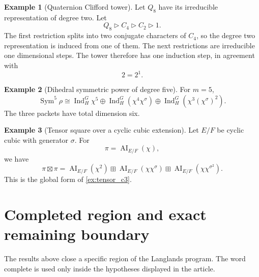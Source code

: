 \documentclass{aomart}
\theoremstyle{definition}
\newtheorem{example}[example]{Example}
\theoremstyle{remark}
\newcommand{\Ind}{\operatorname{Ind}}
\newcommand{\AI}{\operatorname{AI}}
\newcommand{\Sym}{\operatorname{Sym}}
\newcommand{\boxplusop}{\mathbin{\boxplus}}
\begin{document}
\begin{example}[Quaternion Clifford tower]\label{ex:quaternion_tower}
Let \(Q_8\) have its irreducible representation of degree two. Let
\[
Q_8\triangleright C_4\triangleright C_2\triangleright1.
\]
The first restriction splits into two conjugate characters of \(C_4\), so the degree two representation is induced from one of them. The next restrictions are irreducible one dimensional steps. The tower therefore has one induction step, in agreement with
\[
2=2^1.
\]
\end{example}

\begin{example}[Dihedral symmetric power of degree five]\label{ex:dihedral_five}
For \(m=5\),
\[
\Sym^5\rho
\cong
\Ind_H^G\chi^5
\oplus
\Ind_H^G(\chi^4\chi^\sigma)
\oplus
\Ind_H^G(\chi^3(\chi^\sigma)^2).
\]
The three packets have total dimension six.
\end{example}

\begin{example}[Tensor square over a cyclic cubic extension]\label{ex:cubic_tensor_square}
Let \(E/F\) be cyclic cubic with generator \(\sigma\). For
\[
\pi=\AI_{E/F}(\chi),
\]
we have
\[
\pi\boxtimes\pi
=
\AI_{E/F}(\chi^2)
\boxplusop
\AI_{E/F}(\chi\chi^\sigma)
\boxplusop
\AI_{E/F}(\chi\chi^{\sigma^2}).
\]
This is the global form of \cref{ex:tensor_c3}.
\end{example}

\section{Completed region and exact remaining boundary}\label{sec:boundary}

The results above close a specific region of the Langlands program. The word complete is used only inside the hypotheses displayed in the article.
\end{document}
